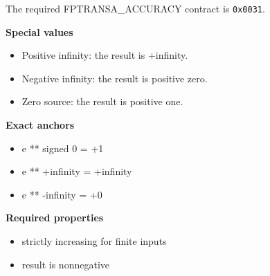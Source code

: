 The required FPTRANSA\_ACCURACY contract is \texttt{0x0031}.

\textbf{Special values}\par
\begin{itemize}
\item Positive infinity: the result is +infinity.
\item Negative infinity: the result is positive zero.
\item Zero source: the result is positive one.
\end{itemize}

\textbf{Exact anchors}\par
\begin{itemize}
\item e ** signed 0 = +1
\item e ** +infinity = +infinity
\item e ** -infinity = +0
\end{itemize}

\textbf{Required properties}\par
\begin{itemize}
\item strictly increasing for finite inputs
\item result is nonnegative
\end{itemize}
